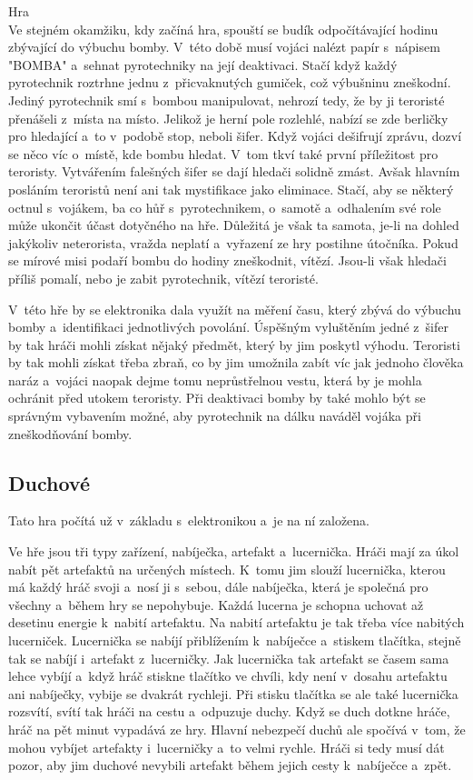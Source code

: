 Hra\\
Ve stejném okamžiku, kdy začíná hra, spouští se budík odpočítávající hodinu zbývající do výbuchu bomby. 
V~této době musí vojáci nalézt papír s~nápisem "BOMBA" a~sehnat pyrotechniky na její deaktivaci. 
Stačí když každý pyrotechnik roztrhne jednu z~přicvaknutých gumiček, což výbušninu zneškodní. 
Jediný pyrotechnik smí s~bombou manipulovat, nehrozí tedy, že by ji teroristé přenášeli z~místa na místo.
Jelikož je herní pole rozlehlé, nabízí se zde berličky pro hledající a~to v~podobě stop, neboli šifer. 
Když vojáci dešifrují zprávu, dozví se něco víc o~místě, kde bombu hledat. 
V~tom tkví také první příležitost pro teroristy. Vytvářením falešných šifer se dají hledači solidně zmást.
Avšak hlavním posláním teroristů není ani tak mystifikace jako eliminace. 
Stačí, aby se některý octnul s~vojákem, ba co hůř s~pyrotechnikem, o~samotě a~odhalením své role může ukončit účast dotyčného na hře. 
Důležitá je však ta samota, je-li na dohled jakýkoliv neterorista, vražda neplatí a~vyřazení ze hry postihne útočníka.
Pokud se mírové misi podaří bombu do hodiny zneškodnit, vítězí. 
Jsou-li však hledači příliš pomalí, nebo je zabit pyrotechnik, vítězí teroristé.

V~této hře by se elektronika dala využít na měření času, který zbývá do výbuchu bomby a~identifikaci jednotlivých povolání.
Úspěšným vyluštěním jedné z~šifer by tak hráči mohli získat nějaký předmět, který by jim poskytl výhodu.
Teroristi by tak mohli získat třeba zbraň, co by jim umožnila zabít víc jak jednoho člověka naráz a~vojáci naopak dejme tomu neprůstřelnou vestu, která by je mohla ochránit před utokem teroristy.
Při deaktivaci bomby by také mohlo být se správným vybavením možné, aby pyrotechnik na dálku naváděl vojáka při zneškodňování bomby.

\subsection{Duchové}
Tato hra počítá už v~základu s~elektronikou a~je na ní založena.

Ve hře jsou tři typy zařízení, nabíječka, artefakt a~lucernička.
Hráči mají za úkol nabít pět artefaktů na určených místech.
K~tomu jim slouží lucernička, kterou má každý hráč svoji a~nosí ji s~sebou, dále nabíječka, která je společná pro všechny a~během hry se nepohybuje.
Každá lucerna je schopna uchovat až desetinu energie k~nabití artefaktu. 
Na nabití artefaktu je tak třeba více nabitých lucerniček.
Lucernička se nabíjí přiblížením k~nabíječce a~stiskem tlačítka, stejně tak se nabíjí i~artefakt z~lucerničky.
Jak lucernička tak artefakt se časem sama lehce vybíjí a~když hráč stiskne tlačítko ve chvíli, kdy není v~dosahu artefaktu ani nabíječky, vybije se dvakrát rychleji.
Při stisku tlačítka se ale také lucernička rozsvítí, svítí tak hráči na cestu a~odpuzuje duchy.
Když se duch dotkne hráče, hráč na pět minut vypadává ze hry.
Hlavní nebezpečí duchů ale spočívá v~tom, že mohou vybíjet artefakty i~lucerničky a~to velmi rychle.
Hráči si tedy musí dát pozor, aby jim duchové nevybili artefakt během jejich cesty k~nabíječce a~zpět.

